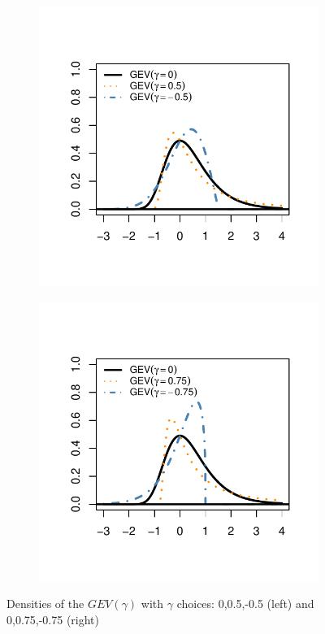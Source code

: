 \begin{figure}[h!]
\centering
	\begin{subfigure}[h]{0.49\linewidth}
\includegraphics[width=\textwidth]{./plots/chapter2_plots/gevdensity1.pdf}
\end{subfigure}
			\begin{subfigure}[h]{0.49\linewidth}
\includegraphics[width=\textwidth]{./plots/chapter2_plots/gevdensity2.pdf}
\end{subfigure}
\caption{Densities of the $GEV(\gamma)$ with $\gamma$ choices: 0,0.5,-0.5 (left) and 0,0.75,-0.75 (right)}
\label{gev}
\end{figure}
